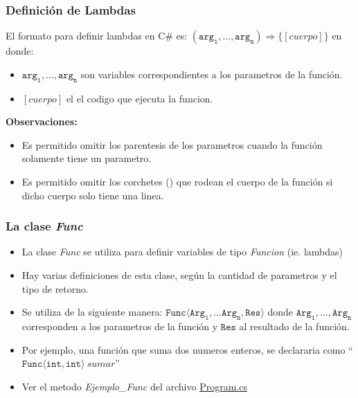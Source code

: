 \documentclass{beamer}
\begin{document}
\begin{frame}
    \frametitle{Definici\'on de Lambdas}
    El formato para definir lambdas en C\# es: $(\mathtt{arg_1},\ldots,\mathtt{arg_n}) \Rightarrow \{[cuerpo]\}$
    en donde:
    \begin{itemize}
        \item{$\mathtt{arg_1},\ldots,\mathtt{arg_n}$ son variables correspondientes a los
        parametros de la funci\'on.}
        \item{$[cuerpo]$ el el codigo que ejecuta la funcion.}
    \end{itemize}
    {\bf Observaciones: }
    \begin{itemize}
        \item{Es permitido omitir los parentesis de los parametros cuando la funci\'on
        solamente tiene un parametro.}
        \item{Es permitido omitir los corchetes ({}) que rodean el cuerpo de la funci\'on
        si dicho cuerpo solo tiene una linea.}
    \end{itemize}
\end{frame}

\begin{frame}
    \frametitle{La clase \emph{Func}}
    \begin{itemize}
        \item{La clase \emph{Func} se utiliza para definir variables de
        tipo \emph{Funcion} (ie. lambdas)}
        \item{Hay varias definiciones de esta clase, seg\'un la cantidad
        de parametros y el tipo de retorno.}
        \item{Se utiliza de la siguiente manera: $\mathtt{Func}\langle\mathtt{Arg_1},\ldots\mathtt{Arg_n},\mathtt{Res}\rangle$
        donde $\mathtt{Arg_1},\ldots,\mathtt{Arg_n}$ corresponden a los parametros de la funci\'on
        y $\mathtt{Res}$ al resultado de la funci\'on.}
        \item{Por ejemplo, una funci\'on que suma dos numeros enteros, se declararia
        como ``$\mathtt{Func}\langle\mathtt{int},\mathtt{int}\rangle\ sumar$''}
        \item{Ver el metodo \emph{Ejemplo\_Func} del archivo \href{run:../Ejemplos/Lambdas/Program.cs}{Program.cs}}
    \end{itemize}
\end{frame}
\end{document}
